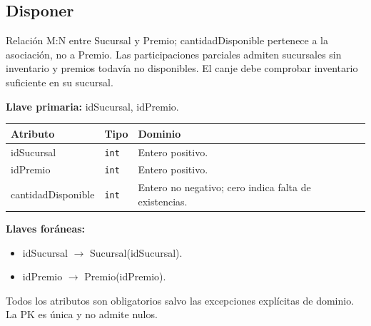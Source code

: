 \par\noindent\begin{minipage}{\textwidth}
\subsection{Disponer}
Relación M:N entre Sucursal y Premio; cantidadDisponible pertenece a la asociación, no a Premio. Las participaciones parciales admiten sucursales sin inventario y premios todavía no disponibles. El canje debe comprobar inventario suficiente en su sucursal.\par
\textbf{Llave primaria:} idSucursal, idPremio.\par
{\small\begin{tabular}{@{}p{}p{}p{}@{}}
\toprule Atributo & Tipo & Dominio \\ \midrule
idSucursal & \texttt{int} & Entero positivo. \\
idPremio & \texttt{int} & Entero positivo. \\
cantidadDisponible & \texttt{int} & Entero no negativo; cero indica falta de existencias. \\
\bottomrule\end{tabular}}
\textbf{Llaves foráneas:}\begin{itemize}[nosep]
\item idSucursal $\rightarrow$ Sucursal(idSucursal).
\item idPremio $\rightarrow$ Premio(idPremio).
\end{itemize}
Todos los atributos son obligatorios salvo las excepciones explícitas de dominio. La PK es única y no admite nulos.
\end{minipage}\par\vspace{.35cm}